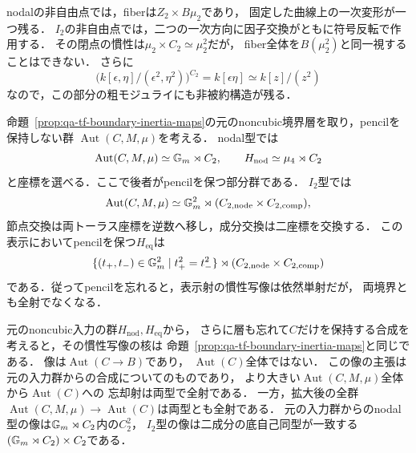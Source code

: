 \begin{remark}[非自由点の慣性と非被約方向]
nodalの非自由点では，fiberは$Z_2\times B\mu_2$であり，
固定した曲線上の一次変形が一つ残る．
$I_2$の非自由点では，二つの一次方向に因子交換がともに符号反転で作用する．
その閉点の慣性は$\mu_2\times C_2\simeq\mu_2^2$だが，
fiber全体を$B(\mu_2^2)$と同一視することはできない．
さらに
\[
 \bigl(k[\epsilon,\eta]/(\epsilon^2,\eta^2)\bigr)^{C_2}
       =k[\epsilon\eta]\simeq k[z]/(z^2)
\]
なので，この部分の粗モジュライにも非被約構造が残る．
\end{remark}

\begin{proposition}[pencilを忘れた場合の慣性の増大]
\label{prop:qa-tf-curve-only-inertia}
命題~\ref{prop:qa-tf-boundary-inertia-maps}の元のnoncubic境界層を取り，pencilを保持しない群
$\operatorname{Aut}(C,M,\mu)$を考える．
nodal型では
\[
 \operatorname{Aut}(C,M,\mu)\simeq\mathbb G_m\rtimes C_2,
 \qquad H_{\mathrm{nod}}\simeq\mu_4\rtimes C_2
\]
と座標を選べる．ここで後者がpencilを保つ部分群である．
$I_2$型では
\[
 \operatorname{Aut}(C,M,\mu)
   \simeq\mathbb G_m^2\rtimes(C_{2,\mathrm{node}}\times C_{2,\mathrm{comp}}),
\]
節点交換は両トーラス座標を逆数へ移し，成分交換は二座標を交換する．
この表示においてpencilを保つ$H_{\mathrm{eq}}$は
\[
 \{(t_+,t_-)\in\mathbb G_m^2\mid t_+^2=t_-^2\}
       \rtimes(C_{2,\mathrm{node}}\times C_{2,\mathrm{comp}})
\]
である．従ってpencilを忘れると，表示射の慣性写像は依然単射だが，
両境界とも全射でなくなる．

元のnoncubic入力の群$H_{\mathrm{nod}},H_{\mathrm{eq}}$から，
さらに層も忘れて$C$だけを保持する合成を考えると，その慣性写像の核は
命題~\ref{prop:qa-tf-boundary-inertia-maps}と同じである．
像は$\operatorname{Aut}(C\to B)$であり，
$\operatorname{Aut}(C)$全体ではない．
この像の主張は元の入力群からの合成についてのものであり，
より大きい$\operatorname{Aut}(C,M,\mu)$全体から$\operatorname{Aut}(C)$への
忘却射は両型で全射である．
一方，拡大後の全群$\operatorname{Aut}(C,M,\mu)\to\operatorname{Aut}(C)$は両型とも全射である．
元の入力群からのnodal型の像は$\mathbb G_m\rtimes C_2$内の$C_2^2$，
$I_2$型の像は二成分の底自己同型が一致する
$(\mathbb G_m\rtimes C_2)\times C_2$である．
\end{proposition}
